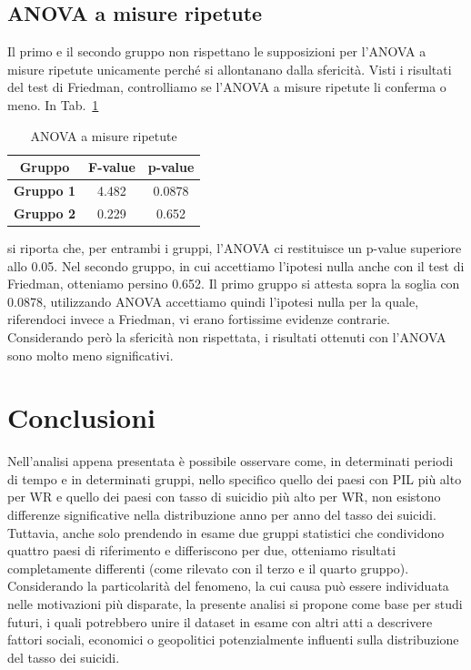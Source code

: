 \documentclass[conference]{IEEEtran}
\begin{document}
\subsection{ANOVA a misure ripetute}

Il primo e il secondo gruppo non rispettano le supposizioni per l'ANOVA a misure ripetute
unicamente perché si allontanano dalla sfericità.
Visti i risultati del test di Friedman, controlliamo se l'ANOVA a misure ripetute li conferma
o meno.
In Tab.~\ref{tab7} 
\begin{table}[htbp]
    \caption{ANOVA a misure ripetute}
    \begin{center}
    \begin{tabular}{|c|c|c|}
    \hline
    \textbf{Gruppo} & \textbf{F-value} & \textbf{p-value} \\
    \hline
    \textbf{Gruppo 1} & 4.482 & 0.0878 \\\cline{1-3}
    \textbf{Gruppo 2} & 0.229 & 0.652 \\\cline{1-3}
    \hline
    \end{tabular}
    \label{tab7}
    \end{center}
\end{table}
si riporta che, per entrambi i gruppi, l'ANOVA ci restituisce un p-value superiore allo 0.05.
Nel secondo gruppo, in cui accettiamo l'ipotesi nulla anche con il test di Friedman,
otteniamo persino 0.652.
Il primo gruppo si attesta sopra la soglia con 0.0878, utilizzando ANOVA accettiamo quindi
l'ipotesi nulla per la quale, riferendoci invece a Friedman, vi erano fortissime evidenze contrarie.
Considerando però la sfericità non rispettata, i risultati ottenuti con l'ANOVA sono molto
meno significativi.


\section{Conclusioni}

Nell'analisi appena presentata è possibile osservare come, in determinati periodi di tempo
e in determinati gruppi, nello specifico quello dei paesi con PIL più alto per WR e
quello dei paesi con tasso di suicidio più alto per WR, non esistono differenze
significative nella distribuzione anno per anno del tasso dei suicidi.
Tuttavia, anche solo prendendo in esame due gruppi statistici che condividono quattro paesi
di riferimento e differiscono per due, otteniamo risultati completamente differenti
(come rilevato con il terzo e il quarto gruppo).
Considerando la particolarità del fenomeno, la cui causa può essere individuata nelle motivazioni più disparate,
la presente analisi si propone come base per studi futuri, i quali potrebbero
unire il dataset in esame
con altri atti a descrivere fattori sociali, economici o geopolitici potenzialmente
influenti sulla distribuzione del tasso dei suicidi.
\end{document}
